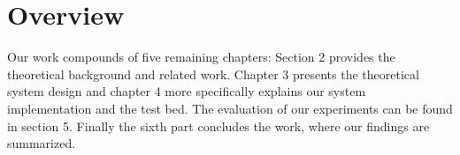 
\section{Overview}

Our work compounds of five remaining chapters:
Section 2 provides the theoretical background and related work. Chapter 3 presents the theoretical system design and chapter 4 more specifically explains our system implementation and the test bed. The evaluation of our experiments can be found in section 5. Finally the sixth part concludes the work, where our findings are summarized.
